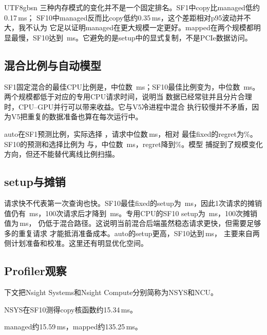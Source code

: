 \documentclass[10.5pt,compsoc]{CjC}
\begin{document}
\begin{CJK*}{UTF8}{gbsn}
三种内存模式的变化并不是一个固定排名。SF1中copy比managed低约0.17\,ms；
SF10中managed反而比copy低约0.35\,ms，这个差距相对p95波动并不大，我不认为
它足以证明managed在更大规模一定更好。mapped在两个规模都明显最慢，SF10达到
\SfTenGpuMappedMedian\,ms。它避免的是setup中的显式复制，不是PCIe数据访问。

\subsection{混合比例与自动模型}

SF1固定混合的最佳CPU比例是\SfOneHybridBestRatio，中位数
\SfOneHybridBestMedian\,ms；SF10最佳比例变为\SfTenHybridBestRatio，中位数
\SfTenHybridBestMedian\,ms。两个规模都低于对应的专用CPU请求时间，说明当
数据已经常驻并且分片合理时，CPU--GPU并行可以带来收益。它与V5冷进程中混合
执行较慢并不矛盾，因为V5把重复的数据准备也算在每次运行中。

auto在SF1预测比例\SfOneHybridAutoPredictedRatio，实际选择
\SfOneHybridAutoSelectedRatio，请求中位数\SfOneHybridAutoMedian\,ms，相对
最佳fixed的regret为\SfOneHybridAutoRegretPercent\%。SF10的预测和选择比例为
\SfTenHybridAutoPredictedRatio 与\SfTenHybridAutoSelectedRatio，中位数
\SfTenHybridAutoMedian\,ms，regret降到\SfTenHybridAutoRegretPercent\%。模型
捕捉到了规模变化方向，但还不能替代离线比例扫描。

\subsection{setup与摊销}

请求快不代表第一次查询也快。SF10最佳fixed的setup为
\SfTenHybridBestSetup\,ms，因此1次请求的摊销值仍有
\SfTenHybridBestAmortizedOne\,ms，100次请求后才降到
\SfTenHybridBestAmortizedHundred\,ms。专用CPU的SF10 setup为
\SfTenCpuBestSetup\,ms，100次摊销值为\SfTenCpuBestAmortizedHundred\,ms，
仍低于混合路径。这说明当前混合后端虽然稳态请求更快，但需要足够多的重复请求
才能抵消准备成本。auto的setup更高，SF10达到\SfTenHybridAutoSetup\,ms，
主要来自两侧计划准备和校准。这里还有明显优化空间。

\subsection{Profiler观察}

下文把Nsight Systems和Nsight Compute分别简称为NSYS和NCU。

NSYS在SF10测得copy核函数约15.34\,ms。

managed约15.59\,ms，mapped约135.25\,ms。


\end{CJK*}
\end{document}
